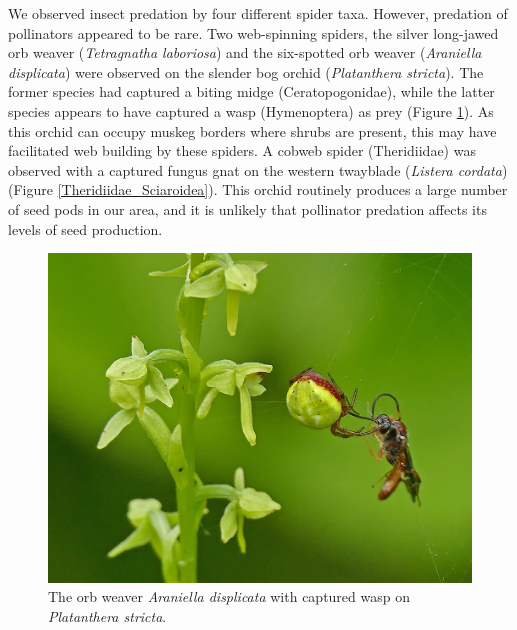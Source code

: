 \begin{multicols}{2}
We observed insect predation by four different spider taxa. However,
predation of pollinators appeared to be rare. Two web-spinning
spiders, the silver long-jawed orb weaver (\emph{Tetragnatha
laboriosa}) and the six-spotted orb weaver (\emph{Araniella
displicata}) were observed on the slender bog orchid (\emph{Platanthera
stricta}). The former species had captured a biting midge
(Ceratopogonidae), while the latter species appears to have captured a wasp (Hymenoptera) %
as prey (Figure \ref{Araniella_displicata_Hymenoptera}). As this orchid can occupy muskeg borders where
shrubs are present, this may have facilitated web building by these
spiders. A cobweb spider (Theridiidae) was observed with a captured
fungus gnat on the western twayblade (\emph{Listera cordata}) (Figure
\ref{Theridiidae_Sciaroidea}). This orchid routinely produces a large number of seed pods in our
area, and it is unlikely that pollinator predation affects its levels of
seed production.

\begin{figure}[H]
\begin{center}
\vspace{2mm}
\includegraphics[width=\textwidth]{img/Araniella_displicata_Hymenoptera.jpg}
\caption{The orb weaver \emph{Araniella displicata} with captured wasp on \emph{Platanthera stricta}.}
\label{Araniella_displicata_Hymenoptera}
\end{center}
\end{figure}



\end{multicols}
